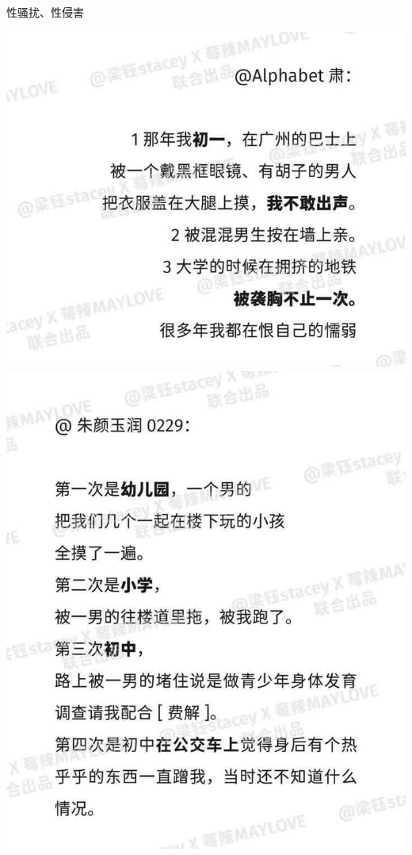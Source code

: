 \begin{frame}{性骚扰、性侵害}
\begin{block}{}
        \includegraphics[height=.55\textheight]{../docs/img/3-5.jpg}
        \includegraphics[height=.55\textheight]{../docs/img/3-6.jpg}
    \end{block}
\end{frame}

